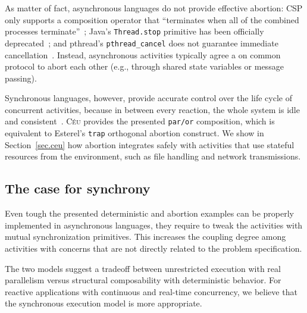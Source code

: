 \documentclass{acm_proc_article-sp}
\newcommand{\CEU}{\textsc{C\'{e}u}\xspace}
\newcommand{\code}[1] {{\small{\texttt{#1}}}}
\newcommand{\1}{\;}
\newcommand{\2}{\;\;}
\newcommand{\3}{\;\;\;}
\newcommand{\5}{\;\;\;\;\;}
\begin{document}
As matter of fact, asynchronous languages do not provide effective abortion:
CSP only supports a composition operator that ``terminates when all of the 
combined processes terminate''~\cite{async.csp};
Java's \code{Thread.stop} primitive has been officially 
deprecated~\cite{sync_async.threadsstop};
and pthread's \code{pthread\_cancel} does not guarantee immediate 
cancellation~\cite{sync_async.pthreadsstop}.
%
Instead, asynchronous activities typically agree a on common protocol to abort 
each other (e.g., through shared state variables or message passing).

Synchronous languages, however, provide accurate control over the life cycle of 
concurrent activities, because in between every reaction, the whole system is 
idle and consistent~\cite{esterel.preemption}.
%
\CEU provides the presented \code{par/or} composition, which is equivalent to 
Esterel's \code{trap} orthogonal abortion construct.
%
We show in Section~\ref{sec.ceu} how abortion integrates safely with activities 
that use stateful resources from the environment, such as file handling and 
network transmissions.


\subsection{The case for synchrony}

Even tough the presented deterministic and abortion examples can be properly 
implemented in asynchronous languages, they require to tweak the activities 
with mutual
synchronization primitives.
%
This increases the coupling degree among activities with concerns that are not 
directly related to the problem specification.

The two models suggest a tradeoff between unrestricted execution with real 
parallelism versus structural composability with deterministic behavior.
%
For reactive applications with continuous and real-time concurrency, we believe 
that the synchronous execution model is more appropriate.
\end{document}
